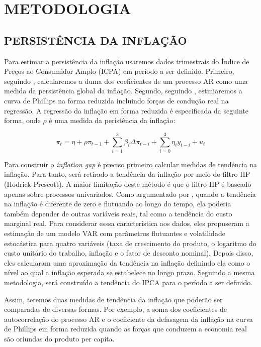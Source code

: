 \documentclass[twoside,a4paper,11pt]{report}
\begin{document}
\pagestyle{empty}
\cleardoublepage
\pagestyle{fancy}

\chapter{METODOLOGIA}\label{cap3en03}

\section*{PERSISTÊNCIA DA INFLAÇÃO}

Para estimar a persistência da inflação usaremos dados trimestrais do Índice de Preços ao Consumidor Amplo (ICPA) em período a ser definido. Primeiro, seguindo \citet{andrews1994approximately}, calcularemos a duma dos coeficientes de um processo AR como uma medida da persistência global da inflação. Segundo, seguindo \citet{whelan2007staggered}, estmiaremos a curva de Phillips na forma reduzida incluindo forças de condução real na regressão. A regressão da inflação em forma reduzida é especificada da seguinte forma, onde $\rho$ é uma medida da peristência da inflação:

\begin{equation}\label{eq01en03}
{\pi}_{t}=\eta +\rho{\pi}_{t-1}+\sum _{i=1}^{3}{{\beta}_{i}\Delta{\pi}_{t-i}} +\sum _{i=0}^{3}{{\eta}_{i}{y}_{t-i}} +{u}_{t}
\end{equation}

Para construir o \emph{inflation gap} é preciso primeiro calcular medidas de tendência na inflação. Para tanto, será retirado a tendência da inflação por meio do filtro HP (Hodrick-Prescott). A maior limitação deste método é que o filtro HP é baseado apenas sobre processos univariados. Como argumentado por \citet{yao2010can,cogley2008trend}, quando a tendência na inflação é diferente de zero e flutuando ao longo do tempo, ela poderia também depender de outras variáveis reais, tal como a tendência do custo marginal real. Para considerar esssa característica aos dados, eles propuseram a estimação de um modelo VAR com parâmetros flutuantes e volatilidade estocástica para quatro variáveis (taxa de crescimento do produto, o logaritmo do custo unitário do trabalho, inflação e o fator de desconto nominal). Depois disso, eles calcularam uma aproximação da tendência na inflação definindo ela como o nível ao qual a inflação esperada se estabelece no longo prazo. Seguindo a mesma metodologia, será construído a tendência do IPCA para o período a ser definido. 

Assim, teremos duas medidas de tendência da inflação que poderão ser comparadas de diversas formas. Por exemplo, a soma dos coeficientes de autocorrelação do processo AR e o coeficiente da defasagem da inflação na curva de Phillips em forma reduzida quando as forças que conduzem a economia real são oriundas do produto per capita.
\end{document}
